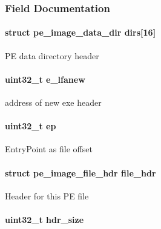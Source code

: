 \subsubsection{Field Documentation}
\hypertarget{structcli__pe__hook__data_aacc309d29c73dbd6ac72ee719e331097}{
\paragraph[{dirs}]{\setlength{\rightskip}{0pt plus 5cm}struct {\bf pe\-\_\-image\-\_\-data\-\_\-dir} dirs\mbox{[}16\mbox{]}}}\label{structcli__pe__hook__data_aacc309d29c73dbd6ac72ee719e331097}
P\-E data directory header \hypertarget{structcli__pe__hook__data_a3d0539adcc53a30b31c2a18bc8b84e00}{
\paragraph[{e\-\_\-lfanew}]{\setlength{\rightskip}{0pt plus 5cm}uint32\-\_\-t e\-\_\-lfanew}}\label{structcli__pe__hook__data_a3d0539adcc53a30b31c2a18bc8b84e00}
address of new exe header \hypertarget{structcli__pe__hook__data_afaed4671662028c061ab84eefcce0546}{
\paragraph[{ep}]{\setlength{\rightskip}{0pt plus 5cm}uint32\-\_\-t ep}}\label{structcli__pe__hook__data_afaed4671662028c061ab84eefcce0546}
Entry\-Point as file offset \hypertarget{structcli__pe__hook__data_a3b996731cad79e0040fc0e4613d20533}{
\paragraph[{file\-\_\-hdr}]{\setlength{\rightskip}{0pt plus 5cm}struct {\bf pe\-\_\-image\-\_\-file\-\_\-hdr} file\-\_\-hdr}}\label{structcli__pe__hook__data_a3b996731cad79e0040fc0e4613d20533}
Header for this P\-E file \hypertarget{structcli__pe__hook__data_af2492dd421362ffced98eb583964b310}{
\paragraph[{hdr\-\_\-size}]{\setlength{\rightskip}{0pt plus 5cm}uint32\-\_\-t hdr\-\_\-size}}\label{structcli__pe__hook__data_af2492dd421362ffced98eb583964b310}
